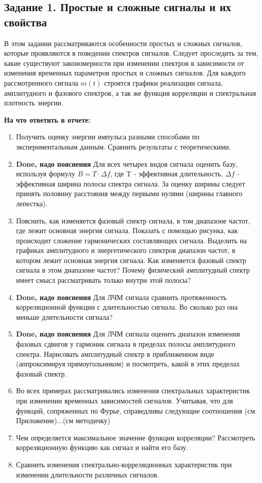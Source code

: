 
\subsection{Задание 1. Простые и сложные сигналы и их свойства}
В этом задании рассматриваются особенности простых и сложных
сигналов, которые проявляются в поведении спектров сигналов. Следует
проследить за тем, какие существуют закономерности при изменении спектров
в зависимости от изменения временных параметров простых и сложных
сигналов.
Для каждого рассмотренного сигнала $m(t)$ строятся графики реализации
сигнала, амплитудного и фазового спектров, а так же функция корреляции и
спектральная плотность энергии.

\textbf{На что ответить в отчете:}
\begin{enumerate}
    \item Получить оценку энергии импульса разными способами по
    экспериментальным данным. Сравнить результаты с
    теоретическими.
    \item \textbf{Done, надо пояснения} Для всех четырех видов сигнала оценить базу,
    используя формулу
    $B=T \cdot \Delta f$, где T - эффективная длительность, $\Delta f$ - эффективная
    ширина полосы спектра сигнала. За оценку ширины следует
    принять половину расстояния между первыми нулями (ширины
    главного лепестка).
    \item Пояснить, как изменяется фазовый спектр сигнала, в том диапазоне
    частот, где лежит основная энергия сигнала. Показать с помощью
    рисунка, как происходит сложение гармонических составляющих
    сигнала. Выделить на графиках амплитудного и энергетического
    спектров диапазон частот, в котором лежит основная энергия
    сигнала. Как изменяется фазовый спектр сигнала в этом диапазоне
    частот? Почему физический амплитудный спектр имеет смысл
    рассматривать только внутри этой полосы?
    \item \textbf{Done, надо пояснения} Для ЛЧМ сигнала сравнить протяженность корреляционной
    функции с длительностью сигнала. Во сколько раз она меньше
    длительности сигнала?
    \item \textbf{Done, надо пояснения} Для ЛЧМ сигнала оценить диапазон изменения фазовых сдвигов у
    гармоник сигнала в пределах полосы амплитудного спектра.
    Нарисовать амплитудный спектр в приближенном виде
    (аппроксимируя прямоугольником) и посмотреть, какой в этих
    пределах фазовый спектр.
    \item Во всех примерах рассматривались изменения спектральных
    характеристик при изменении временных зависимостей сигналов.
    Учитывая, что для функций, сопряженных по Фурье, справедливы
    следующие соотношения (см. Приложение)...(см методичку)
    \item Чем определяется максимальное значение функции корреляции?
    Рассмотреть корреляционную функцию как сигнал и найти его базу.
    \item Сравнить изменения спектрально-корреляционных характеристик
    при изменении длительности различных сигналов.
\end{enumerate}


